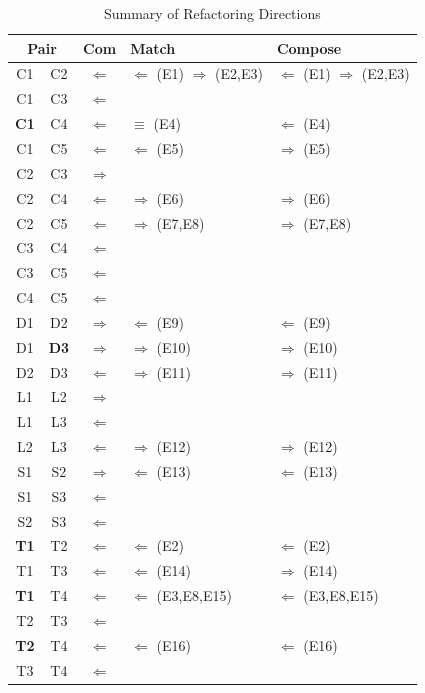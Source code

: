 
\begin{table}[t]
\caption{Summary of Refactoring Directions \label{summaryResults}}
\begin{center}
\begin{tabular}{|c@{ }c | c  l l @{}|} \hline
\multicolumn{2}{|c|}{\textbf{Pair}} & \textbf{Com} & \textbf{Match} & \textbf{Compose} \\ \hline \hline
C1 & C2 & $\Leftarrow$  & $\Leftarrow$ (E1) $\Rightarrow$ (E2,E3) & $\Leftarrow$ (E1) $\Rightarrow$ (E2,E3)\\
C1 & C3 & $\Leftarrow$ & & \\
\textbf{C1} & C4 & $\Leftarrow$ & $\equiv$ (E4) & $\Leftarrow$  (E4)\\
C1 & C5 & $\Leftarrow$ & $\Leftarrow$ (E5) & $\Rightarrow$ (E5) \\
C2 & C3 & $\Rightarrow$ & & \\
C2 & C4 & $\Leftarrow$ & $\Rightarrow$ (E6) & $\Rightarrow$ (E6)\\
C2 & C5 & $\Leftarrow$ & $\Rightarrow$ (E7,E8) & $\Rightarrow$ (E7,E8)\\
C3 & C4 & $\Leftarrow$ & & \\
C3 & C5 & $\Leftarrow$ & & \\
C4 & C5 & $\Leftarrow$ & & \\
\hline
D1 & D2 & $\Rightarrow$ & $\Leftarrow$ (E9)& $\Leftarrow$ (E9) \\
D1 & \textbf{D3} & $\Rightarrow$ & $\Rightarrow$ (E10)& $\Rightarrow$ (E10) \\
D2 & D3 & $\Leftarrow$ & $\Rightarrow$ (E11) & $\Rightarrow$ (E11) \\
\hline
L1 & L2 & $\Rightarrow$ & & \\
L1 & L3 & $\Leftarrow$ & & \\
L2 & L3 & $\Leftarrow$ & $\Rightarrow$ (E12) & $\Rightarrow$ (E12)  \\
\hline
S1 & S2 & $\Rightarrow$ & $\Leftarrow$ (E13) & $\Leftarrow$ (E13) \\
S1 & S3 & $\Leftarrow$ & & \\
S2 & S3 & $\Leftarrow$ & & \\
\hline
\textbf{T1} & T2 & $\Leftarrow$  & $\Leftarrow$ (E2)& $\Leftarrow$ (E2) \\
T1 & T3 & $\Leftarrow$ & $\Leftarrow$ (E14) & $\Rightarrow$ (E14)\\
\textbf{T1} & T4 & $\Leftarrow$ & $\Leftarrow$ (E3,E8,E15) & $\Leftarrow$ (E3,E8,E15)\\
T2 & T3 & $\Leftarrow$ & & \\
\textbf{T2} & T4 & $\Leftarrow$ & $\Leftarrow$ (E16) & $\Leftarrow$ (E16)\\
T3 & T4 & $\Leftarrow$ & & \\
\hline


\end{tabular}
\end{center}
\end{table}


